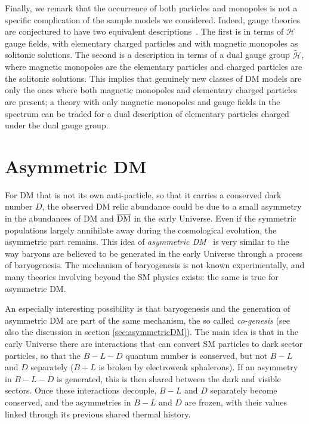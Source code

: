 \smallskip

Finally, we remark that the occurrence of both particles and monopoles 
is not a specific complication of the sample models we considered.
Indeed, gauge theories are conjectured to have two equivalent descriptions~\cite{magnetic:monopoles}. 
The first is in terms of $\mathcal{H}$ gauge fields, with elementary charged particles and with magnetic monopoles as solitonic solutions.
The second is a description in terms of a dual gauge group $ \mathcal{\tilde H}$, 
where magnetic monopoles are the elementary particles and charged particles are the solitonic solutions. 
This implies that genuinely new classes of DM models are only the ones where both magnetic monopoles and elementary charged particles are present; a theory with only magnetic monopoles and gauge fields in the spectrum can be traded for a dual description of elementary particles charged under the dual gauge group. 



\section{Asymmetric DM }
\label{sec:AsymmetricDMth}

For DM that is not its own anti-particle, so that it carries a conserved dark number $D$, the observed DM relic abundance could be due to a small asymmetry in the abundances of DM and $\overline{\rm DM}$ in the early Universe. 
Even if the symmetric populations largely annihilate away during the cosmological evolution,  the asymmetric part remains. This idea of {\em asymmetric DM}~\cite{AsymmetricDM} is very similar to the way baryons are believed to be generated in the early Universe through a process of baryogenesis. 
The mechanism of baryogenesis is not known experimentally, 
and many theories involving beyond the SM physics exists:
the same is true for asymmetric DM. 


An especially interesting possibility is that baryogenesis and the generation of asymmetric DM are part of the same mechanism, the so called {\em co-genesis} (see also the discussion in section \ref{sec:asymmetricDM}). 
The main idea is that in the early Universe there are interactions that can convert SM particles to dark sector particles, so that the $B-L-D$ quantum number is conserved, but not $B-L$ and $D$ separately ($B+L$ is broken by electroweak sphalerons). If an asymmetry in $B-L-D$ is generated, this is then shared between the dark and visible sectors. Once these interactions decouple, $B-L$ and $D$ separately become conserved, and the asymmetries in  $B-L$ and $D$ are frozen, with their values linked through its previous shared thermal history. 

